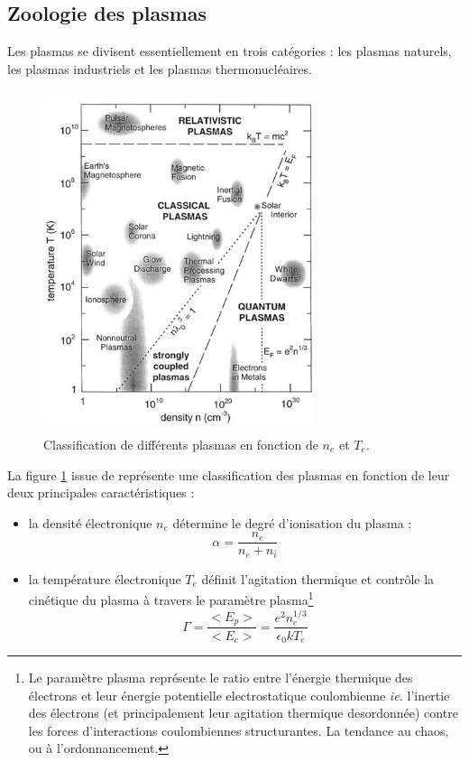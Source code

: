 		\subsection{Zoologie des plasmas}
			Les plasmas se divisent essentiellement en trois catégories : les plasmas
			naturels, les plasmas industriels et les plasmas thermonucléaires.
			\begin{figure}
				\centering
				\includegraphics[height=100mm,width=80mm]{figures/zoologie.png}{\caption{Classification
				de différents plasmas en fonction de $n_e$ et $T_e$.}\label{zoologie}}
			\end{figure}
			La figure \ref{zoologie} issue de \cite{national1995Plasma} représente une
			classification des plasmas en fonction de leur deux principales
			caractéristiques : 
			\begin{itemize}
				\item la densité électronique $n_e$ détermine le degré d'ionisation du plasma :
				$$\alpha=\frac{n_e}{n_e+n_i}$$ 
				\item la température électronique $T_e$ définit
			l'agitation thermique et contrôle la cinétique du plasma à travers le paramètre plasma\footnote{Le paramètre 
			plasma représente le ratio
			entre l'énergie thermique des électrons et leur énergie potentielle electrostatique coulombienne 
			\emph{ie.} l'inertie des électrons (et principalement leur agitation thermique desordonnée) contre les forces
			d'interactions coulombiennes structurantes. La tendance au chaos, ou à l'ordonnancement.}
			$$\Gamma=\frac{<E_p>}{<E_c>}=\frac{e^2n_e^{1/3}}{\epsilon_0 kT_e}$$
			\end{itemize}
			
